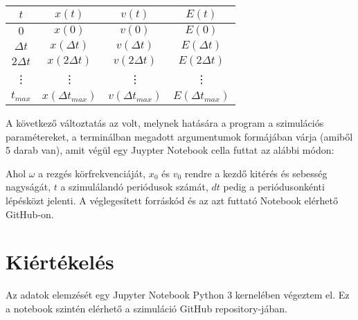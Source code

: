 \begin{multicols}{2}
\begin{center}
\begin{tabular}{c|c|c|c}
$t$ & $x \left( t \right)$ & $v \left( t \right)$ & $E \left( t \right)$ \\
\hline \hline
$0$ & $x \left( 0 \right)$ & $v \left( 0 \right)$  & $E \left( 0 \right)$ \\
\hline
$\Delta t$ & $x \left( \Delta t \right)$ & $v \left( \Delta t \right)$ & $E \left( \Delta t \right)$ \\
\hline
$2 \Delta t$ & $x \left( 2 \Delta t \right)$ & $v \left( 2 \Delta t \right)$ & $E \left( 2 \Delta t \right)$ \\
\hline
\vdots & \vdots & \vdots & \vdots \\
\hline
$t_{max}$ & $x \left( \Delta t_{max} \right)$ & $v \left( \Delta t_{max} \right)$ & $E \left( \Delta t_{max} \right)$ \\
\hline
\end{tabular}
\end{center}
\label{tab1}
\hfill \break \hfill \break
\noindent A következő változtatás az volt, melynek hatására a program a szimulációs paramétereket, a terminálban megadott argumentumok formájában várja (amiből 5 darab van), amit végül egy Juypter Notebook cella futtat az alábbi módon:
\begin{center}
\end{center}
Ahol $\omega$ a rezgés körfrekvenciáját, $x_{0}$ és $v_{0}$ rendre a kezdő kitérés és sebesség nagyságát, $t$ a szimulálandó periódusok számát, $dt$ pedig a periódusonkénti lépésközt jelenti. A véglegesített forráskód és az azt futtató Notebook elérhető GitHub-on\cite{github}.

\section{Kiértékelés}
Az adatok elemzését egy Jupyter Notebook Python 3 kernelében végeztem el. Ez a notebook szintén elérhető a szimuláció GitHub repository-jában\cite{github}.


\end{multicols}
